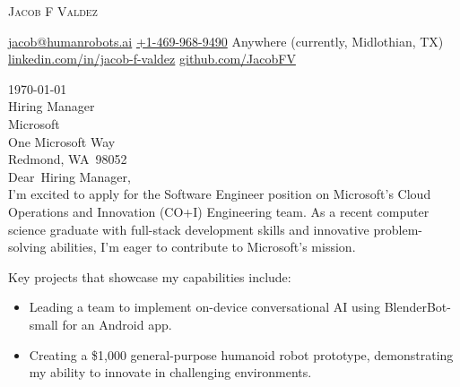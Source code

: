 \documentclass[12pt]{letter}
\makeatletter
\newcommand{\myname}{Jacob F Valdez}
\newcommand{\myemail}{jacob@humanrobots.ai}
\newcommand{\myphone}{+1-469-968-9490}
\newcommand{\mylocation}{Anywhere (currently, Midlothian, TX)}
\newcommand{\mylinkedin}{jacob-f-valdez}
\newcommand{\recipient}{Hiring Manager}
\newcommand{\company}{Microsoft}
\newcommand{\street}{One Microsoft Way}
\newcommand{\city}{Redmond}
\newcommand{\state}{WA}
\newcommand{\zip}{98052}
\newcommand{\greeting}{Dear}
\makeatother
\begin{document}

\begin{center}
    {\fontsize{28}{0}\selectfont\scshape \myname}

    {\fontsize{10.5}{0}\selectfont\href{mailto:\myemail}{\faEnvelope\enspace \myemail} \quad \href{tel:\myphone}{\faPhone\enspace \myphone} \quad \faMapMarker\enspace \mylocation}
    \vspace{-0.1in}
    {\fontsize{10.5}{0}\selectfont\href{https://linkedin.com/in/\mylinkedin}{\faLinkedinIn\enspace linkedin.com/in/\mylinkedin} \quad \href{https://github.com/JacobFV}{\faGithub\enspace github.com/JacobFV}}
\end{center}

\vspace{0.2in}

\today\\

\vspace{-0.1in}\recipient\\
\company\\
\street\\
\city, \state\ \zip\\

\vspace{-0.1in}\greeting\ \recipient,\\

\vspace{-0.1in}\setlength\parindent{24pt}
\noindent I'm excited to apply for the Software Engineer position on Microsoft's Cloud Operations and Innovation (CO+I) Engineering team. As a recent computer science graduate with full-stack development skills and innovative problem-solving abilities, I'm eager to contribute to Microsoft's mission.

Key projects that showcase my capabilities include:

\begin{itemize}
    \item Leading a team to implement on-device conversational AI using BlenderBot-small for an Android app.
    \item Creating a \$1,000 general-purpose humanoid robot prototype, demonstrating my ability to innovate in challenging environments.
\end{itemize}
\end{document}
